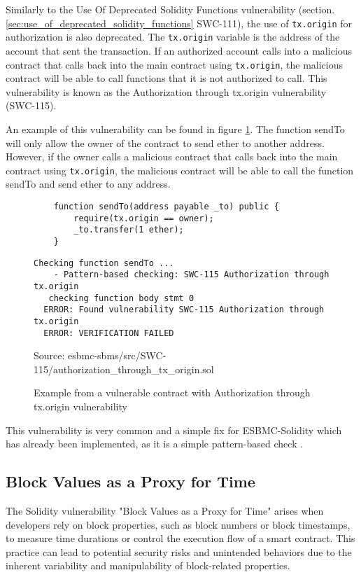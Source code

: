 Similarly to the Use Of Deprecated Solidity Functions vulnerability (section. \ref{sec:use_of_deprecated_solidity_functions} SWC-111), the use of \verb|tx.origin| for authorization is also deprecated. The \verb|tx.origin| variable is the address of the account that sent the transaction. If an authorized account calls into a malicious contract that calls back into the main contract using \verb|tx.origin|, the malicious contract will be able to call functions that it is not authorized to call. This vulnerability is known as the Authorization through tx.origin vulnerability (SWC-115). 

An example of this vulnerability can be found in figure \ref{fig:tx.origin}. The function sendTo will only allow the owner of the contract to send ether to another address. However, if the owner calls a malicious contract that calls back into the main contract using \verb|tx.origin|, the malicious contract will be able to call the function sendTo and send ether to any address. 

\begin{figure}
\begin{lstlisting}
    function sendTo(address payable _to) public {
        require(tx.origin == owner);
        _to.transfer(1 ether);
    }
\end{lstlisting}

\begin{lstlisting}
Checking function sendTo ...
    - Pattern-based checking: SWC-115 Authorization through tx.origin
   checking function body stmt 0
  ERROR: Found vulnerability SWC-115 Authorization through tx.origin
  ERROR: VERIFICATION FAILED
\end{lstlisting}
\caption{Example from a vulnerable contract with Authorization through tx.origin vulnerability}
\label{fig:tx.origin}
Source: esbmc-sbms/src/SWC-115/authorization\_through\_tx\_origin.sol
\end{figure}

This vulnerability is very common and a simple fix for ESBMC-Solidity which has already been implemented, as it is a simple pattern-based check \cite{salim2022esbmc}.

\subsection{Block Values as a Proxy for Time}
\label{sec:block_values_as_a_proxy_for_time}

The Solidity vulnerability "Block Values as a Proxy for Time" arises when developers rely on block properties, such as block numbers or block timestamps, to measure time durations or control the execution flow of a smart contract. This practice can lead to potential security risks and unintended behaviors due to the inherent variability and manipulability of block-related properties.

